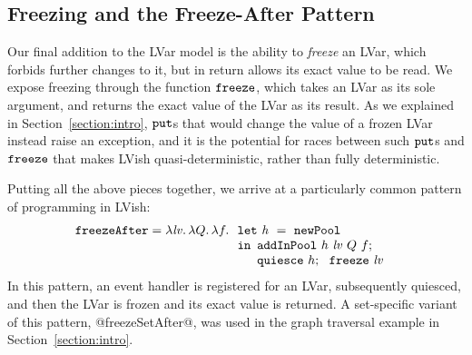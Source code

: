 \subsection{Freezing and the Freeze-After Pattern}\label{subsection:freeze-after}

Our final addition to the LVar model is the ability to \emph{freeze} an LVar,
which forbids further changes to it, but in return allows its exact value to be
read.  We expose freezing through the function $\mbox{\texttt{freeze}}$, which takes an LVar as
its sole argument, and returns the exact value of the LVar as its result.  As we
explained in Section~\ref{section:intro}, $\mbox{\texttt{put}}$s that would change the value of a frozen
LVar instead raise an exception, and it is the potential for races between
such $\mbox{\texttt{put}}$s and $\mbox{\texttt{freeze}}$ that makes LVish quasi-deterministic, rather than
fully deterministic.

Putting all the above pieces together, we arrive at a particularly common
pattern of programming in LVish:
\[
\begin{array}[t]{l}
  \mbox{\texttt{freezeAfter}} = \lambda\mathit{lv}.\,\lambda Q.\,\lambda f.\,
  \begin{array}[t]{l}
    \mbox{\texttt{let}}~\mathit{h}~=~{\mbox{\texttt{newPool}}} \\
    \mbox{\texttt{in}}
      \begin{array}[t]{l}  
        {\mbox{\texttt{addInPool}}}~h~\mathit{lv}~Q~f; 
\\
        {\mbox{\texttt{quiesce}}}~h;~~
        \mbox{\texttt{freeze}}~\mathit{lv}
      \end{array}
  \end{array}
\end{array}
\]
In this pattern, an event handler is registered for an LVar, subsequently
quiesced, and then the LVar is frozen and its exact value is returned.  A
set-specific variant of this pattern, @freezeSetAfter@, was used in the
graph traversal example in Section~\ref{section:intro}.
